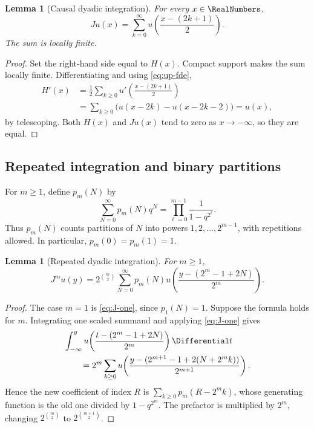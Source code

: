 \documentclass[11pt,oneside]{article}
\newtheorem{lemma}[theorem]{Lemma}
\theoremstyle{definition}
\theoremstyle{remark}
\begin{document}
\begin{lemma}[Causal dyadic integration]
For every $x\in\RealNumbers$,
\begin{equation}
 Ju(x)=\sum_{k=0}^{\infty}
 u\!\left(\frac{x-(2k+1)}2\right).
 \label{eq:J-one}
\end{equation}
The sum is locally finite.
\end{lemma}

\begin{proof}
Set the right-hand side equal to $H(x)$.  Compact support makes the sum
locally finite.  Differentiating and using \eqref{eq:up-fde},
\begin{align*}
 H'(x)
 &=\frac12\sum_{k\ge0}
 u'\!\left(\frac{x-(2k+1)}2\right)\\
 &=\sum_{k\ge0}\bigl(u(x-2k)-u(x-2k-2)\bigr)=u(x),
\end{align*}
by telescoping.  Both $H(x)$ and $Ju(x)$ tend to zero as $x\to-\infty$,
so they are equal.
\end{proof}

\subsection{Repeated integration and binary partitions}
For $m\ge1$, define $p_m(N)$ by
\begin{equation}
 \sum_{N=0}^{\infty}p_m(N)q^N
 =\prod_{\ell=0}^{m-1}\frac1{1-q^{2^\ell}}.
 \label{eq:binary-partition-p}
\end{equation}
Thus $p_m(N)$ counts partitions of $N$ into powers
$1,2,\ldots,2^{m-1}$, with repetitions allowed.  In particular,
$p_m(0)=p_m(1)=1$.

\begin{lemma}[Repeated dyadic integration]
For $m\ge1$,
\begin{equation}
 J^m u(y)
 =2^{\binom m2}\sum_{N=0}^{\infty}p_m(N)
 u\!\left(\frac{y-(2^m-1+2N)}{2^m}\right).
 \label{eq:Jm}
\end{equation}
\end{lemma}

\begin{proof}
The case $m=1$ is \eqref{eq:J-one}, since $p_1(N)=1$.  Suppose the formula
holds for $m$.  Integrating one scaled summand and applying
\eqref{eq:J-one} gives
\begin{align*}
 &\int_{-\infty}^{y}
 u\!\left(\frac{t-(2^m-1+2N)}{2^m}\right)\Differential t\\
 &\qquad=2^m\sum_{k\ge0}
 u\!\left(
 \frac{y-(2^{m+1}-1+2(N+2^mk))}{2^{m+1}}
 \right).
\end{align*}
Hence the new coefficient of index $R$ is
$\sum_{k\ge0}p_m(R-2^mk)$, whose generating function is the old one divided
by $1-q^{2^m}$.  The prefactor is multiplied by $2^m$, changing
$2^{\binom m2}$ to $2^{\binom{m+1}2}$.
\end{proof}
\end{document}
